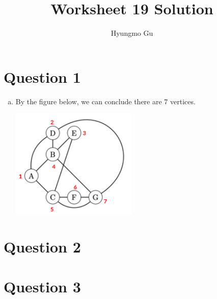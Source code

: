 \documentclass[12pt]{article}
\begin{document}
\title{Worksheet 19 Solution}
\author{Hyungmo Gu}
\maketitle

\section*{Question 1}
\begin{enumerate}[a.]
    \item

    By the figure below, we can conclude there are 7 vertices.

    \begin{center}
    \includegraphics[width=6cm]{images/worksheet_19_q1a_solution.png}
    \end{center}

\end{enumerate}

\section*{Question 2}

\section*{Question 3}
\end{document}
